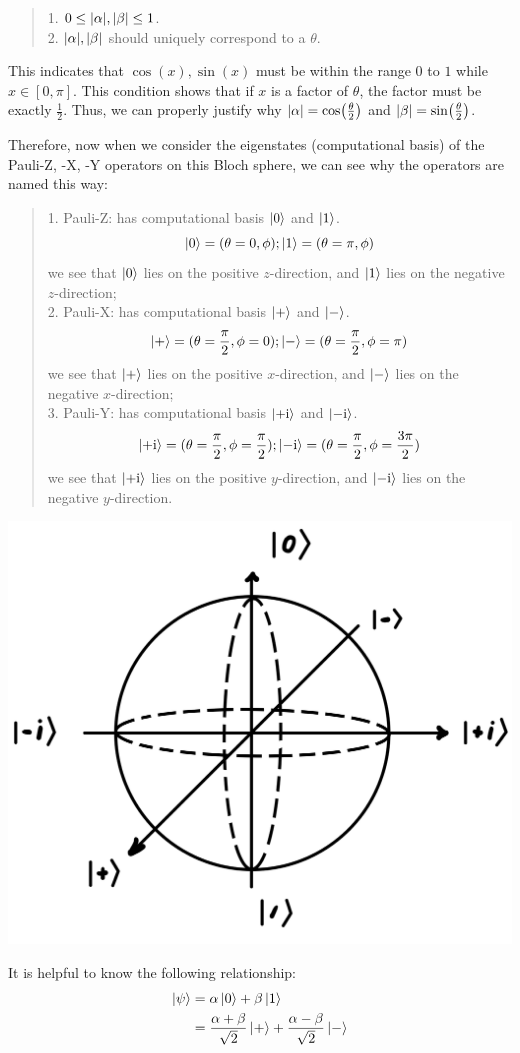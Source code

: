\begin{quote}
    1. $0 \le \abs{\alpha}, \abs{\beta} \le 1$. \\
    2. $\abs{\alpha}, \abs{\beta}$ should uniquely correspond to a $\theta$.
\end{quote}
This indicates that $\cos(x), \sin(x)$ must be within the range $0$ to $1$ while $x \in [0, \pi]$. This condition shows that if $x$ is a factor of $\theta$, the factor must be exactly $\frac{1}{2}$. Thus, we can properly justify why $\abs{\alpha} = \cos(\frac{\theta}{2})$ and $\abs{\beta} = \sin(\frac{\theta}{2})$. \par
Therefore, now when we consider the eigenstates (computational basis) of the Pauli-Z, -X, -Y operators on this Bloch sphere, we can see why the operators are named this way:
\begin{quote}
    1. Pauli-Z: has computational basis $\ket{0}$ and $\ket{1}$.
    $$\ket{0} = (\theta = 0, \phi); \ket{1} = (\theta = \pi, \phi)$$
    we see that $\ket{0}$ lies on the positive $z$-direction, and $\ket{1}$ lies on the negative $z$-direction; \\
    2. Pauli-X: has computational basis $\ket{+}$ and $\ket{-}$.
    $$\ket{+} = (\theta = \frac{\pi}{2}, \phi = 0); \ket{-} = (\theta = \frac{\pi}{2}, \phi = \pi)$$
    we see that $\ket{+}$ lies on the positive $x$-direction, and $\ket{-}$ lies on the negative $x$-direction; \\
    3. Pauli-Y: has computational basis $\ket{+\mathrm{i}}$ and $\ket{-\mathrm{i}}$.
    $$\ket{+\mathrm{i}} = (\theta = \frac{\pi}{2}, \phi = \frac{\pi}{2}); \ket{-\mathrm{i}} = (\theta = \frac{\pi}{2}, \phi = \frac{3\pi}{2})$$
    we see that $\ket{+\mathrm{i}}$ lies on the positive $y$-direction, and $\ket{-\mathrm{i}}$ lies on the negative $y$-direction.
\end{quote}
\begin{center}
    \includegraphics[scale = 0.25]{bloch-sphere.png}
\end{center}
It is helpful to know the following relationship:
\begin{align*}
    \ket{\psi} &= \alpha \ket{0} + \beta \ket{1} \\
    &= \frac{\alpha + \beta}{\sqrt{2}}\ket{+} + \frac{\alpha - \beta}{\sqrt{2}}\ket{-}
\end{align*}

\newpage